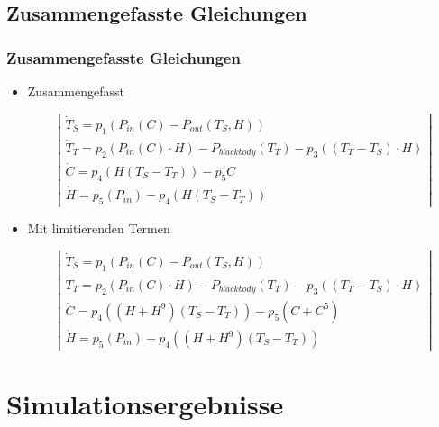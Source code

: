 \documentclass{beamer}
\begin{document}
\subsection{Zusammengefasste Gleichungen}

\begin{frame}
\frametitle{Zusammengefasste Gleichungen}
\begin{itemize}
	\item[] Zusammengefasst
	
\begin{equation}
\left|
\begin{array}{lcl}
\dot{T}_S = p_1 \left( P_{in}(C) - P_{out}(T_S, H) \right) \\
\dot{T}_T = p_2 \left( P_{in}(C) \cdot H \right) - P_{blackbody}(T_T) - p_3 \left( (T_T - T_S) \cdot H \right) \\
\dot{C} = p_4 \left( H(T_S - T_T) \right) - p_5 C \\
\dot{H} = p_5 \left(P_{in} \right) - p_4 \left( H(T_S - T_T) \right)
\end{array}
\right|
\end{equation}
	
	\pause
	
	\item[] Mit limitierenden Termen
	
\begin{equation}
\left|
\begin{array}{lcl}
\dot{T}_S = p_1 \left( P_{in}(C) - P_{out}(T_S, H) \right) \\
\dot{T}_T = p_2 \left( P_{in}(C) \cdot H \right) - P_{blackbody}(T_T) - p_3 \left( (T_T - T_S) \cdot H \right) \\
\dot{C} = p_4 \left( (H + H^9)(T_S - T_T) \right) - p_5 (C + C^5) \\
\dot{H} = p_5 \left(P_{in} \right) - p_4 \left( (H + H^9 )(T_S - T_T) \right)
\end{array}
\right|
\end{equation}

\end{itemize}
\end{frame}

\section{Simulationsergebnisse}
\end{document}
